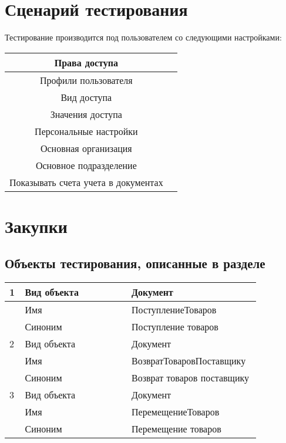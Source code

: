 \section{Сценарий тестирования}

Тестирование производится под пользователем со следующими настройками:

\begin{tabular}{|c|c|}
	\hline
	Права доступа &  \\
	\hline
	Профили пользователя &  \\
	\hline
	Вид доступа &  \\
	\hline
	Значения доступа &  \\
	\hline
	Персональные настройки &  \\
	\hline
	Основная организация &  \\
	\hline
	Основное подразделение &  \\
	\hline
	Показывать счета учета в документах &  \\
	\hline
\end{tabular}

\section{Закупки}
\subsection{Объекты тестирования, описанные в разделе}

\begin{tabular}{p{0.05\linewidth}p{0.4\linewidth}p{0.4\linewidth}}
	\toprule
	1 & Вид объекта & Документ \\
	\hline
	  & Имя & ПоступлениеТоваров \\
	\hline
	 & Синоним  & Поступление товаров \\
	\hline
	2 & Вид объекта  & Документ \\
	\hline
 	 & Имя & ВозвратТоваровПоставщику \\
	\hline
	 & Синоним  & Возврат товаров поставщику \\
	\hline
	3 & Вид объекта  & Документ \\
	\hline
	& Имя & ПеремещениеТоваров \\
	\hline
	& Синоним  & Перемещение товаров \\
	\hline
	\bottomrule %
\end{tabular}


